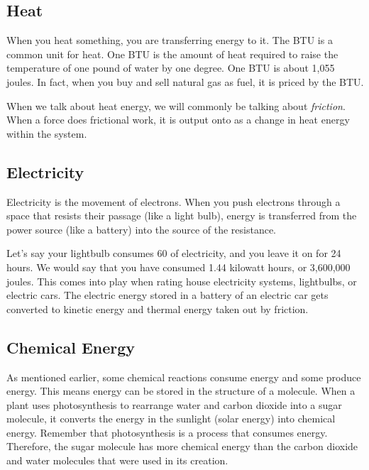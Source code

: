 \subsection{Heat}

When you heat something, you are transferring energy to it. The BTU is a common 
unit for heat. One BTU is the amount of heat required to raise the temperature of 
one pound of water by one degree. One BTU is about 1,055 joules. In fact, when 
you buy and sell natural gas as fuel, it is priced by the BTU. 

When we talk about heat energy, we will commonly be talking about \emph{friction}. When a force does frictional work, it is output onto as a change in heat energy within the system. 

\subsection{Electricity}

Electricity is the movement of electrons. When you push electrons through a space 
that resists their passage (like a light bulb), energy is transferred from the 
power source (like a battery) into the source of the resistance.

Let's say your lightbulb consumes 60  of electricity, and you leave it on 
for 24 hours. We would say that you have consumed 1.44 kilowatt hours, or 
3,600,000 joules. This comes into play when rating house electricity systems, lightbulbs, or electric cars. The electric energy stored in a battery of an electric car gets converted to kinetic energy and thermal energy taken out by friction.


\subsection{Chemical Energy}

As mentioned earlier, some chemical reactions consume energy and some produce 
energy. This means energy can be stored in the structure of a molecule. When a 
plant uses photosynthesis to rearrange water and carbon dioxide into a sugar 
molecule, it converts the energy in the sunlight (solar energy) into chemical 
energy. Remember that photosynthesis is a process that consumes energy. 
Therefore, the sugar molecule has more chemical energy than the carbon dioxide 
and water molecules that were used in its creation.

